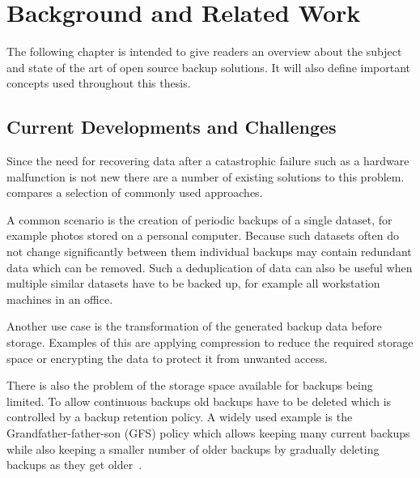 \chapter{Background and Related Work}\label{ch:background}

The following chapter is intended to give readers an overview about the
subject and state of the art of open source backup solutions.
It will also define important concepts used throughout this thesis.

\section{Current Developments and Challenges}\label{sec:current-developments}

Since the need for recovering data after a catastrophic failure such as a hardware
malfunction is not new there are a number of existing solutions to this problem.
 compares a selection of commonly used approaches.

A common scenario is the creation of periodic backups of a single dataset, for
example photos stored on a personal computer.
Because such datasets often do not change significantly between them individual
backups may contain redundant data which can be removed.
Such a deduplication of data can also be useful when multiple similar datasets
have to be backed up, for example all workstation machines in an office.

Another use case is the transformation of the generated backup data before storage.
Examples of this are applying compression to reduce the required storage space
or encrypting the data to protect it from unwanted access.

There is also the problem of the storage space available for backups being limited.
To allow continuous backups old backups have to be deleted which is controlled
by a backup retention policy.
A widely used example is the Grandfather-father-son (GFS) policy which allows
keeping many current backups while also keeping a smaller number of older
backups by gradually deleting backups as they get older~\cite[section `Usage']{Borg1}.

\begin{table}
    \caption{Comparison of a selection of existing backup approaches.}\label{tab:approaches}
\end{table}

